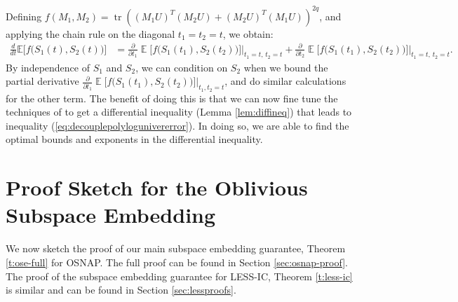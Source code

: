 \documentclass[11pt]{amsart}
\numberwithin{equation}{section}
\numberwithin{equation}{section}
\DeclareMathOperator{\E}{\mathbb{E}}
\DeclareMathOperator*{\tr}{tr}
\theoremstyle{remark}
\theoremstyle{definition}
\begin{document}
Defining $f(M_1,M_2)=\tr((M_1U)^T(M_2U)+(M_2U)^T(M_1U))^{2q}$, and applying the chain rule on the diagonal $t_1=t_2=t$, we obtain:
\begin{align*}
\frac{d}{dt} \mathbb{E}\bigl[f\bigl(S_1(t),S_2(t)\bigr)\bigr]
&=\frac{\partial}{\partial t_1}\E\bigl[ f\bigl(S_1(t_1),S_2(t_2)\bigr)\bigr]\Big|_{t_1=t,\,t_2=t}
+\frac{\partial}{\partial t_2}\E\bigl[ f\bigl(S_1(t_1),S_2(t_2)\bigr)\bigr]\Big|_{t_1=t,\,t_2=t}.
\end{align*}
By independence of $S_1$ and $S_2$, we can condition on $S_2$ when we bound the partial derivative $\frac{\partial}{\partial t_1}\E\bigl[f\bigl(S_1(t_1),S_2(t_2)\bigr)\bigr]\big|_{t_1, t_2=t}$, and do similar calculations for the other term. The benefit of doing this is that we can now fine tune the techniques of \cite{brailovskaya2022universality} to get a differential inequality (Lemma \ref{lem:diffineq}) that leads to inequality (\ref{eq:decouplepolylogunivererror}). In doing so, we are able to find the optimal bounds and exponents in the differential inequality.  

\section{Proof Sketch for the Oblivious Subspace Embedding} \label{sec:proofsketch}

We now sketch the proof of our main subspace embedding guarantee, Theorem \ref{t:ose-full} for OSNAP. The full proof can be found in Section \ref{sec:osnap-proof}. The proof of the subspace embedding guarantee for LESS-IC, Theorem \ref{t:less-ic} is similar and can be found in Section \ref{sec:lessproofs}.
\end{document}
